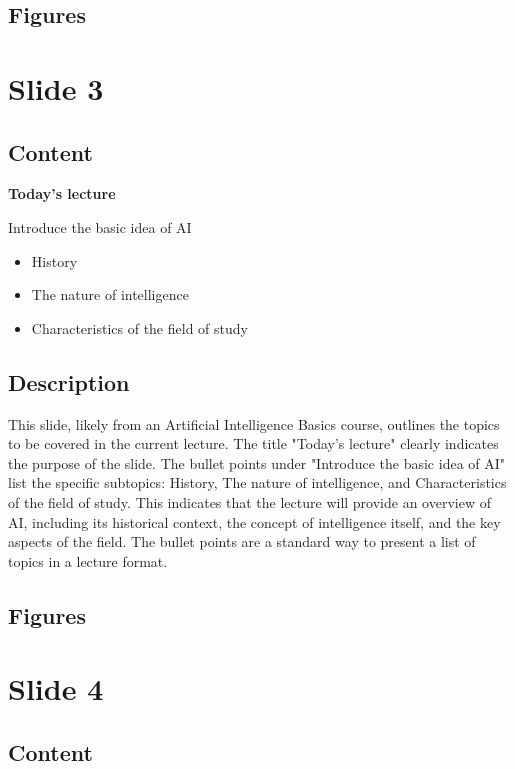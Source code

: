 \documentclass{article}%
\begin{document}
\subsection{Figures}%
\begin{figure}[H]%
\centering%
\end{figure}

%
\newpage%
\section{Slide 3}%
\label{sec:Slide3}%
\subsection{Content}%

\textbf{Today's lecture}

Introduce the basic idea of AI
\begin{itemize}
    \item History
    \item The nature of intelligence
    \item Characteristics of the field of study
\end{itemize}
%
\subsection{Description}%
This slide, likely from an Artificial Intelligence Basics course, outlines the topics to be covered in the current lecture.  The title "Today's lecture" clearly indicates the purpose of the slide.  The bullet points under "Introduce the basic idea of AI" list the specific subtopics: History, The nature of intelligence, and Characteristics of the field of study.  This indicates that the lecture will provide an overview of AI, including its historical context, the concept of intelligence itself, and the key aspects of the field.  The bullet points are a standard way to present a list of topics in a lecture format.%
\subsection{Figures}%
\begin{figure}[H]%
\centering%
\end{figure}

%
\newpage%
\section{Slide 4}%
\label{sec:Slide4}%
\subsection{Content}%
\end{document}
